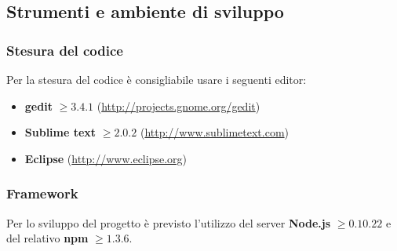 \subsection{Strumenti e ambiente di sviluppo}
		
		\subsubsection{Stesura del codice}
		
		Per la stesura del codice è consigliabile usare i seguenti editor:
		\begin{itemize}
			\item \textbf{gedit} $\geq 3.4.1$ (\url{http://projects.gnome.org/gedit})
			\item \textbf{Sublime text} $\geq 2.0.2$ (\url{http://www.sublimetext.com})
			\item \textbf{Eclipse} (\url{http://www.eclipse.org})
		\end{itemize}
		
		\subsubsection{Framework}
		
		Per lo sviluppo del progetto è previsto l'utilizzo del server \textbf{Node.js} $\geq 0.10.22$ e del relativo  \textbf{npm} $\geq 1.3.6$.